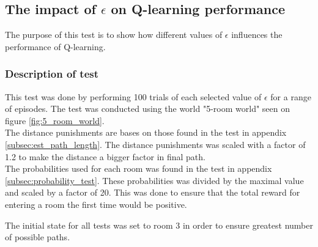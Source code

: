 \documentclass[../Head/Main.tex]{subfiles}
\begin{document}
\subsection{The impact of $\epsilon$ on Q-learning performance}
The purpose of this test is to show how different values of $\epsilon$ influences the performance of Q-learning.
\subsubsection{Description of test}
This test was done by performing 100 trials of each selected value of $\epsilon$ for a range of episodes. The test was conducted using the world "5-room world" seen on figure \ref{fig:5_room_world}.\\
The distance punishments are bases on those found in the test in appendix \ref{subsec:est_path_length}. The distance punishments was scaled with a factor of 1.2 to make the distance a bigger factor in final path.\\
The probabilities used for each room was found in the test in appendix \ref{subsec:probability_test}. These probabilities was divided by the maximal value and scaled by a factor of 20. This was done to ensure that the total reward for entering a room the first time would be positive.\par 
The initial state for all tests was set to room 3 in order to ensure greatest number of possible paths.

\end{document}
